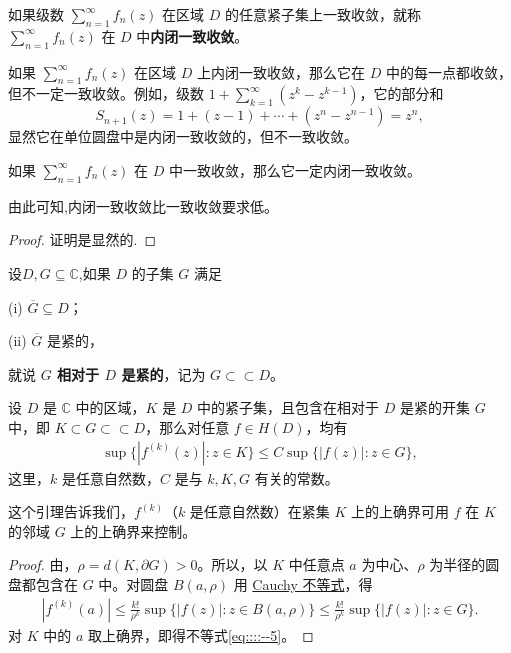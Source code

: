 \documentclass[../../main.tex]{subfiles}%
\begin{document}
\begin{definition}
如果级数 \( \sum_{n=1}^{\infty} f_n(z) \) 在区域 \( D \) 的任意紧子集上一致收敛，就称 \( \sum_{n=1}^{\infty} f_n(z) \) 在 \( D \) 中\textbf{内闭一致收敛}。
\end{definition}
\begin{remark}
如果 \( \sum_{n=1}^{\infty} f_n(z) \) 在区域 \( D \) 上内闭一致收敛，那么它在 \( D \) 中的每一点都收敛，但不一定一致收敛。例如，级数 \( 1 + \sum_{k=1}^{\infty} (z^k - z^{k - 1}) \)，它的部分和
\[
S_{n + 1}(z) = 1 + (z - 1) + \cdots + (z^n - z^{n - 1}) = z^n,
\]
显然它在单位圆盘中是内闭一致收敛的，但不一致收敛。
\end{remark}

\begin{proposition}
如果 \( \sum_{n=1}^{\infty} f_n(z) \) 在 \( D \) 中一致收敛，那么它一定内闭一致收敛。
\end{proposition}
\begin{note}
由此可知,内闭一致收敛比一致收敛要求低。
\end{note}
\begin{proof}
证明是显然的.
\end{proof}

\begin{definition}
设$D,G\subseteq \mathbb{C}$,如果 \( D \) 的子集 \( G \) 满足

(i) \( \overline{G} \subseteq D \)；

(ii) \( \overline{G} \) 是紧的，

就说 \textbf{\( G \) 相对于 \( D \) 是紧的}，记为 \( G \subset\subset D \)。
\end{definition}

\begin{lemma}\label{lemma:引理4.1.8}
设 \( D \) 是 \( \mathbb{C} \) 中的区域，\( K \) 是 \( D \) 中的紧子集，且包含在相对于 \( D \) 是紧的开集 \( G \) 中，即 \( K \subset G \subset\subset D \)，那么对任意 \( f \in H(D) \)，均有
\begin{align}
\sup\{|f^{(k)}(z)| : z \in K\} \leqslant C\sup\{|f(z)| : z \in G\},\label{eq::::--5}
\end{align}
这里，\( k \) 是任意自然数，\( C \) 是与 \( k, K, G \) 有关的常数。
\end{lemma}
\begin{note}
这个引理告诉我们，\( f^{(k)} \)（\( k \) 是任意自然数）在紧集 \( K \) 上的上确界可用 \( f \) 在 \( K \) 的邻域 \( G \) 上的上确界来控制。
\end{note}
\begin{proof}
由，\( \rho = d(K, \partial G) > 0 \)。所以，以 \( K \) 中任意点 \( a \) 为中心、\( \rho \) 为半径的圆盘都包含在 \( G \) 中。对圆盘 \( B(a, \rho) \) 用 \hyperref[theorem:Cauchy不等式(离散版)-复变函数]{Cauchy 不等式}，得
\begin{align*}
|f^{(k)}(a)| \leqslant \frac{k!}{\rho^k}\sup\{|f(z)| : z \in B(a, \rho)\} \leqslant \frac{k!}{\rho^k}\sup\{|f(z)| : z \in G\}.
\end{align*}
对 \( K \) 中的 \( a \) 取上确界，即得不等式\eqref{eq::::--5}。
\end{proof}
\end{document}
